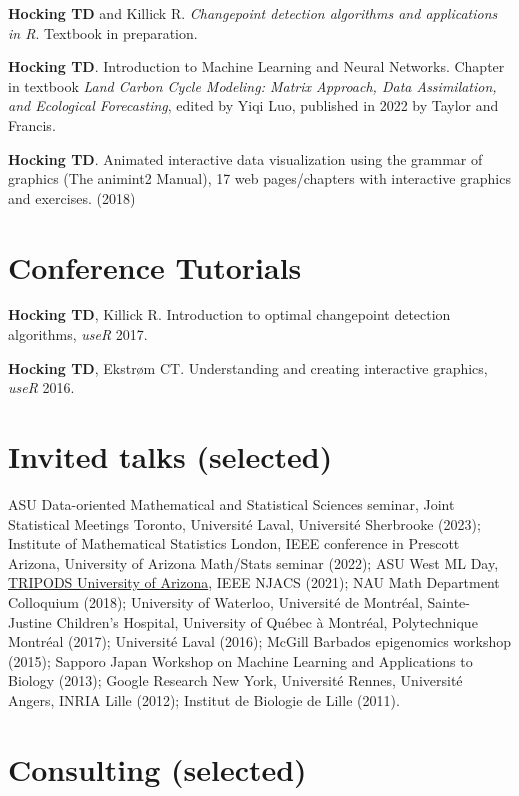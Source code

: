 \documentclass[margin,line]{res}
\begin{document}
\begin{resume}
{\bf Hocking TD} and Killick R. {\it Changepoint detection algorithms
  and applications in R}. Textbook in preparation.

{\bf Hocking TD}. Introduction to Machine Learning and Neural
Networks. Chapter in textbook {\it Land Carbon Cycle Modeling: Matrix
  Approach, Data Assimilation, and Ecological Forecasting}, edited by
Yiqi Luo, published in 2022 by Taylor and Francis.

{\bf Hocking TD}. Animated interactive data visualization using the
grammar of graphics (The animint2 Manual), 17 web pages/chapters with
interactive graphics and exercises. (2018)

\section{\sc Conference Tutorials}

{\bf Hocking TD}, Killick R. Introduction to optimal changepoint
detection algorithms, {\it useR} 2017.

{\bf Hocking TD}, Ekstr\o m CT. Understanding and creating interactive
graphics, {\it useR} 2016.

\section{\sc Invited talks (selected)}

ASU Data-oriented Mathematical and Statistical Sciences seminar, Joint
Statistical Meetings Toronto, Universit\'e Laval, Universit\'e
Sherbrooke (2023); Institute of Mathematical Statistics London, IEEE
conference in Prescott Arizona, University of Arizona Math/Stats
seminar (2022); ASU West ML Day,
\href{https://arizona.hosted.panopto.com/Panopto/Pages/Viewer.aspx?id=4e87c8d0-96d2-40d1-808c-ad16014c6962}{TRIPODS
  University of Arizona}, IEEE NJACS (2021); NAU Math Department
Colloquium (2018); University of Waterloo, Université de Montréal,
Sainte-Justine Children's Hospital, University of Québec à Montréal,
Polytechnique Montréal (2017); Universit\'e Laval (2016); McGill
Barbados epigenomics workshop (2015); Sapporo Japan Workshop on
Machine Learning and Applications to Biology (2013); Google Research
New York, Universit\'e Rennes, Universit\'e Angers, INRIA Lille
(2012); Institut de Biologie de Lille (2011).

\section{\sc Consulting (selected)}


\end{resume}
\end{document}
